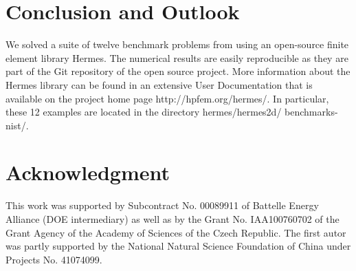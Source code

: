 \documentclass[12pt]{elsarticle}
\begin{document}
\section{Conclusion and Outlook}
\label{sec:conclusion}

We solved a suite of twelve benchmark problems from \cite{mitchell-1}
using an open-source finite element library Hermes. The numerical results are
easily reproducible as they are part of the Git repository of the
open source project. More information about the Hermes library can be found
in an extensive User Documentation that is available on the project home
page http://hpfem.org/hermes/. In particular, these 12 examples are located
in the directory hermes/hermes2d/ benchmarks-nist/.

\section{Acknowledgment}

This work was supported by Subcontract No. 00089911 of Battelle
Energy Alliance (DOE intermediary) as well as by the
Grant No. IAA100760702 of the Grant Agency of the Academy
of Sciences of the Czech Republic. The first autor was partly
supported by the National Natural Science Foundation
of China under Projects No. 41074099.







\end{document}
